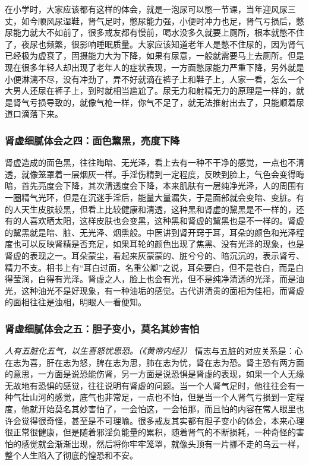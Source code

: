 在小学时，大家应该都有这样的体会，就是一泡尿可以憋一节课，当年迎风尿三丈，如今顺风尿湿鞋，肾气足时，憋尿能力强，小便时冲力也足，肾气亏损后，憋尿能力就大不如前了，很多戒友都有慢前，喝水没多久就要上厕所，根本就憋不住了，夜尿也频繁，很影响睡眠质量。大家应该知道老年人是憋不住尿的，因为肾气已经极为虚衰了，固摄能力大为下降，如果有尿意，一般就需要马上去厕所。但是现在很多年轻人却出现了老年人的症状表现，一方面憋尿能力严重下降，另外就是小便淋漓不尽，没有冲劲了，弄不好就滴在裤子上和鞋子上，人家一看，怎么一个大男人还尿在裤子上，到时就相当尴尬了。尿无力和射精无力的原理是一样的，就是肾气亏损导致的，就像气枪一样，你气不足了，就无法推射出去了，只能顺着尿道口滴落下来。

\subsubsection{肾虚细腻体会之四：面色黧黑，亮度下降}

肾虚造成的面色黑，往往晦暗、无光泽，看上去有一种不干净的感觉，一点也不清透，就像笼罩着一层烟灰一样。手淫伤精到一定程度，反映到脸上，气色会变得晦暗，首先亮度会下降，其次清透度会下降，本来肌肤有一层纯净光泽，人的周围有一圈精气光环，但是在沉迷手淫后，能量大量漏失，于是面部就会变暗、变脏。有的人天生皮肤较黑，但看上比较健康和清透，这种黑和肾虚的黧黑是不一样的，还有的人喜欢晒太阳，这样皮肤也会变黑，这种黑和肾虚的黧黑也是不一样的。肾虚的黧黑就是暗、脏、无光泽、烟熏般。中医讲到肾开窍于耳，耳朵的颜色和光泽程度也可以反映肾精是否充足，如果耳轮的颜色出现了焦黑、没有光泽的现象，也是肾虚的表现之一。耳朵蒙尘，看起来灰蒙蒙的、脏兮兮的、暗沉沉的，表示肾亏、精力不支。相书上有“耳白过面，名重公卿”之说，耳朵要白，但不是苍白，而是白得莹润，白得有光泽。肾虚之人，脸上也会有光，但不是纯净清透的光泽，而是油光，这种油光不是好现象，有一种油垢的感觉。古代讲清贵的面相为佳相，而肾虚的面相往往是浊相，明眼人一看便知。

\subsubsection{肾虚细腻体会之五：胆子变小，莫名其妙害怕}

\textit{人有五脏化五气，以生喜怒忧思恐。（《黄帝内经》）} 情志与五脏的对应关系是：心在志为喜，肝在志为怒，脾在志为思，肺在志为忧，肾在志为恐。肾主恐有两方面的意思，一方面是说恐能伤肾，另一方面是说恐惧是肾虚的表现，如果一个人无缘无故地有恐惧的感觉，往往说明有肾虚的问题。当一个人肾气足时，他往往会有一种气壮山河的感觉，底气也非常足，一点也不怕，但是当一个人肾气亏损到一定程度，他就开始莫名其妙害怕了，一会怕这，一会怕那，而且怕的内容在常人眼里也许会觉得很奇怪，甚至是不可理喻。很多戒友其实都有胆子变小的体会，本来心理很正常很健康，但是随着邪淫负能量的累积，随着肾气的不断损耗，一种奇怪的害怕的感觉就会渐渐出现，然后将你牢牢笼罩，就像头顶有一片挪不走的乌云一样，整个人生陷入了彻底的惶恐和不安。

